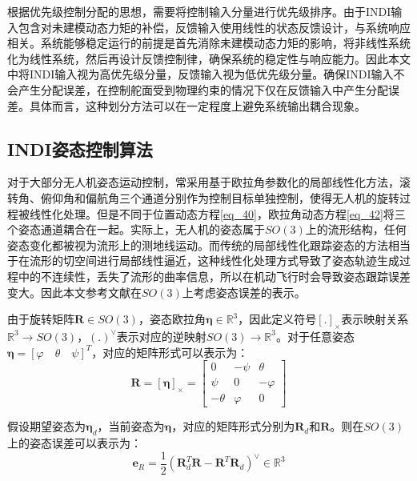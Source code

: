 根据优先级控制分配的思想，需要将控制输入分量进行优先级排序。由于INDI输入包含对未建模动态力矩的补偿，反馈输入使用线性的状态反馈设计，与系统响应相关。系统能够稳定运行的前提是首先消除未建模动态力矩的影响，将非线性系统化为线性系统，然后再设计反馈控制律，确保系统的稳定性与响应能力。因此本文中将INDI输入视为高优先级分量，反馈输入视为低优先级分量。确保INDI输入不会产生分配误差，在控制舵面受到物理约束的情况下仅在反馈输入中产生分配误差。具体而言，这种划分方法可以在一定程度上避免系统输出耦合现象\cite{HKXB202010026}。

\subsection{INDI姿态控制算法}

对于大部分无人机姿态运动控制，常采用基于欧拉角参数化的局部线性化方法，滚转角、俯仰角和偏航角三个通道分别作为控制目标单独控制，使得无人机的旋转过程被线性化处理。但是不同于位置动态方程\eqref{eq_40}，欧拉角动态方程\eqref{eq_42}将三个姿态通道耦合在一起。实际上，无人机的姿态属于$SO(3)$上的流形结构，任何姿态变化都被视为流形上的测地线运动。而传统的局部线性化跟踪姿态的方法相当于在流形的切空间进行局部线性逼近，这种线性化处理方式导致了姿态轨迹生成过程中的不连续性，丢失了流形的曲率信息，所以在机动飞行时会导致姿态跟踪误差变大。因此本文参考文献\parencite{10.1115/1.4052714}在$SO(3)$上考虑姿态误差的表示。

由于旋转矩阵$\boldsymbol{R}\in{SO(3)}$，姿态欧拉角$\boldsymbol{\eta}\in\mathbb{R}^3$，因此定义符号$[.]_\times$表示映射关系$\mathbb{R}^3\to SO(3)$，$(.)^\vee$表示对应的逆映射$SO(3)\to\mathbb{R}^3$。对于任意姿态$\boldsymbol{\eta}=[\varphi \quad \theta \quad \psi]^T$，对应的矩阵形式可以表示为：
\begin{equation}
    \boldsymbol{R}=[\boldsymbol{\eta}]_\times=
    \begin{bmatrix}
    0 & -\psi & \theta \\
    \psi & 0 & -\varphi \\
    -\theta & \varphi & 0
    \end{bmatrix}
    \label{3-22}
\end{equation}

假设期望姿态为$\boldsymbol{\eta}_d$，当前姿态为$\boldsymbol{\eta}$，对应的矩阵形式分别为$\boldsymbol{R}_d$和$\boldsymbol{R}$。则在${SO(3)}$上的姿态误差可以表示为：
\begin{equation}
    \boldsymbol{e}_R=\dfrac{1}{2}(\boldsymbol{R}_d^T\boldsymbol{R}-\boldsymbol{R}^T\boldsymbol{R}_d)^\vee\in \mathbb{R}^3
    \label{3-23}
\end{equation}

